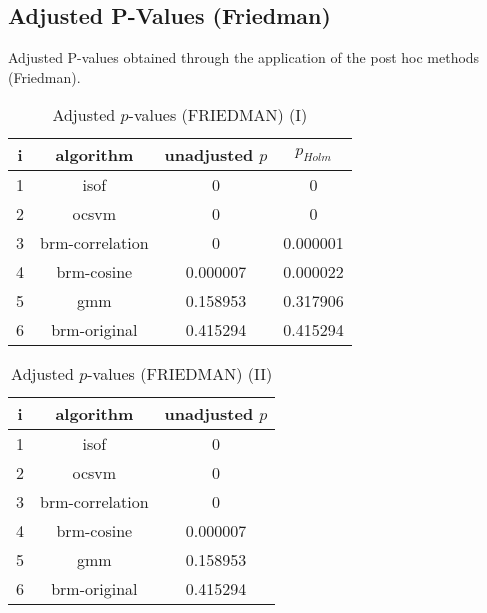 \documentclass[a4paper,10pt]{article}
\begin{document}
\begin{landscape}
\newpage

\section{Adjusted P-Values (Friedman)}


Adjusted P-values obtained through the application of the post hoc methods (Friedman).

\begin{table}[!htp]
\centering\small
\begin{tabular}{cccc}
i&algorithm&unadjusted $p$&$p_{Holm}$\\
\hline1&isof&0&0\\2&ocsvm&0&0\\3&brm-correlation&0&0.000001\\4&brm-cosine&0.000007&0.000022\\5&gmm&0.158953&0.317906\\6&brm-original&0.415294&0.415294\\\hline
\end{tabular}
\caption{Adjusted $p$-values (FRIEDMAN) (I)}
\end{table}
\begin{table}[!htp]
\centering\small
\begin{tabular}{ccc}
i&algorithm&unadjusted $p$\\
\hline1&isof&0\\2&ocsvm&0\\3&brm-correlation&0\\4&brm-cosine&0.000007\\5&gmm&0.158953\\6&brm-original&0.415294\\\hline
\end{tabular}
\caption{Adjusted $p$-values (FRIEDMAN) (II)}
\end{table}

\newpage
\end{landscape}
\end{document}
